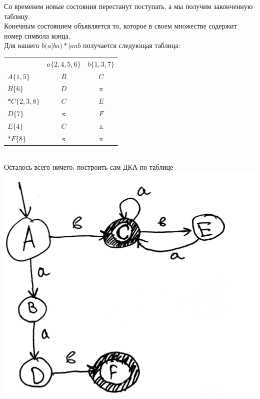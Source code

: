 \documentclass[14pt]{extreport}
\begin{document}
	Со временем новые состояния перестанут поступать, а мы получим законченную таблицу.\\
	Конечным состоянием объявляется то, которое в своем множестве содержит номер символа конца.\\
	\newpage
	Для нашего $b(a|ba)*|aab$ получается следующая таблица:\\
		\begin{tabular}{lcc}
			 & $a\{2, 4, 5, 6\}$ & $b\{1, 3, 7\}$ \\
			 $A\{1, 5\}$ & $B$ & $C$ \\
			 $B\{6\}$ & $D$ & x \\
			 $*C\{2, 3, 8\}$ & $C$ & $E$ \\
			 $D\{7\}$ & x & $F$ \\
			 $E\{4\}$ & $C$ & x \\
			 $*F\{8\}$ & x & x \\
		\end{tabular}\\
	Осталось всего ничего: построить сам ДКА по таблице\\
	\includegraphics[scale=0.11]{data/pic3_3.png}\\
\end{document}
